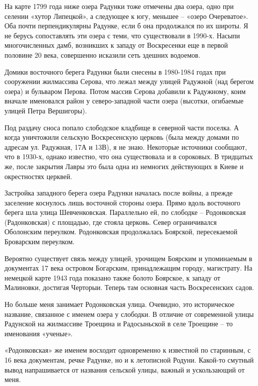 На карте 1799 года ниже озера Радунки тоже отмечены два озера, одно при селении «хутор Липецкой», а следующее к югу, меньшее – «озеро Очереватое». Оба почти перпендикулярны Радунке, если б она продолжался по их широты. Я не берусь сопоставлять эти озера с теми, что существовали в 1990-х. Насыпи многочисленных дамб, возникших к западу от Воскресенки еще в первой половине 20 века, совершенно исказили сеть здешних водоемов.

Домики восточного берега Радунки были снесены в 1980-1984 годах при сооружении жилмассива Серова, что лежал между улицей Радужной (над берегом озера) и бульваром Перова. Потом массив Серова добавили к Радужному, коим вначале именовался район у северо-западной части озера (высотки, огибаемые улицей Петра Вершигоры). 

Под раздачу сноса попало слободское кладбище в северной части поселка. А когда уничтожили сельскую Воскресенскую церковь (была между домами по адресам ул. Радужная, 17А и 13В), я не знаю. Некоторые источники сообщают, что в 1930-х, однако известно, что она существовала и в сороковых. В тридцатых же, после закрытия Лавры это была одна из немногих действующих в Киеве и окрестностях церквей.

Застройка западного берега озера Радунки началась после войны, а прежде заселение коснулось лишь восточной стороны озера. Прямо вдоль восточного берега шла улица Шевченковская. Параллельно ей, по слободке – Родонковская (Радонковская) с площадью, где стояла церковь. Север ограничивался Оболонским переулком. Родонковская продолжалась Боярской, пересекаемой Броварским переулком.

Вероятно существует связь между улицей, урочищем Боярским и упоминаемым в документах 17 века островом Богарским, принадлежащим городу, магистрату. На немецкой карте 1943 года показано также болото Боярское, к западу от Малиновки, достигая Черторыи. Теперь там основная часть Воскресенских садов. 

Но больше меня занимает Родонковская улица. Очевидно, это историческое название, связанное с именем озера у слободки. В отличие от современной улицы Радунской на жилмассиве Троещина и Радосыньской в селе Троещине – то именования «ученые».

«Родонковская» же именем восходит одновременно к известной по старинным, с 16 века документам, речке Радунке, но и к летописной Родуни. Какой-то смутный вывод напрашивается от названия сельской улицы, важный и ускользающий от меня.



